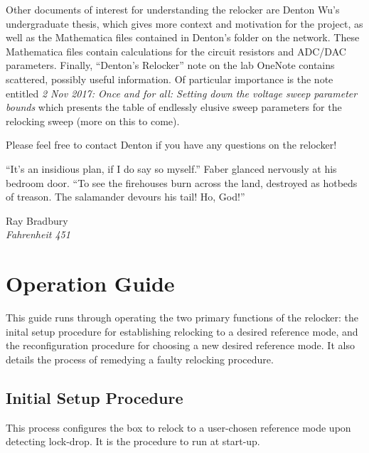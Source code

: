 \documentclass[10pt]{report}
\begin{document}
Other documents of interest for understanding the relocker are Denton Wu's undergraduate thesis, which gives more context and motivation for the project, as well as the Mathematica files contained in Denton's folder on the network. These Mathematica files contain calculations for the circuit resistors and ADC/DAC parameters. Finally, ``Denton's Relocker'' note on the lab OneNote contains scattered, possibly useful information. Of particular importance is the note entitled \textit{2 Nov 2017: Once and for all: Setting down the voltage sweep parameter bounds} which presents the table of endlessly elusive sweep parameters for the relocking sweep (more on this to come).

Please feel free to contact Denton if you have any questions on the relocker!


\epigraph{``It's an insidious plan, if I do say so myself.'' Faber glanced nervously at his bedroom door. ``To see the firehouses burn across the land, destroyed as hotbeds of treason. The salamander devours his tail! Ho, God!'' }{Ray Bradbury \\ \textit{Fahrenheit 451}}

\chapter{Operation Guide}\label{chap:operatingGuide}

This guide runs through operating the two primary functions of the relocker: the inital setup procedure for establishing relocking to a desired reference mode, and the reconfiguration procedure for choosing a new desired reference mode. It also details the process of remedying a faulty relocking procedure.

\section{Initial Setup Procedure}
\label{sect:initialSetupProcedure}

This process configures the box to relock to a user-chosen reference mode upon detecting lock-drop. It is the procedure to run at start-up.
\end{document}
